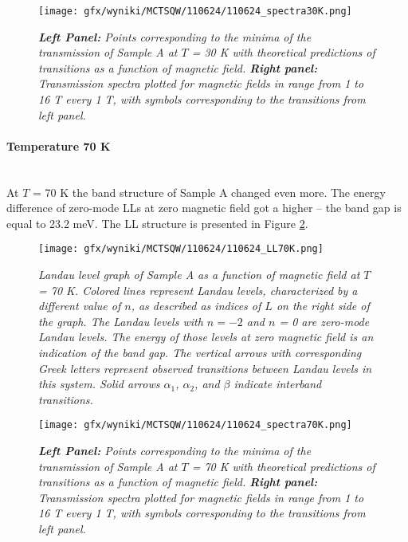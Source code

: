 \documentclass[titlepage,a4paper]{book}
\newcommand{\wciecie}{\quad\phantom{v}}
\newcommand{\myparagraph}[1]{\paragraph{#1}\mbox{}\\}
\begin{document}
\begin{figure}[H]
	\centering
	\texttt{[image: gfx/wyniki/MCTSQW/110624/110624\_spectra30K.png]}
	\vspace{-10pt}
	\caption{\textit{\textbf{Left Panel:} Points corresponding to the minima of the transmission of Sample A at $T$ = 30 K with theoretical predictions of transitions as a function of magnetic field. \textbf{Right panel:} Transmission spectra plotted for magnetic fields in range from 1 to 16 T every 1 T, with symbols corresponding to the transitions from left panel.}}
	\label{fig:Spectra_110624_30K}
\end{figure}

\myparagraph{Temperature 70 K}
\wciecie
At $T$ = 70 K the band structure of Sample A changed even more. The energy difference of zero-mode LLs at zero magnetic field got a higher -- the band gap is equal to 23.2 meV. The LL structure is presented in Figure \ref{fig:LL_110624_70K}.

\begin{figure}[H]
	\centering
	\texttt{[image: gfx/wyniki/MCTSQW/110624/110624\_LL70K.png]}
	\vspace{-10pt}
	\caption{\textit{Landau level graph of Sample A as a function of magnetic field at $T$ = 70 K. Colored lines represent Landau levels, characterized by a different value of $n$, as described as indices of $L$ on the right side of the graph. The Landau levels with $n = -2$ and $n$ = 0 are zero-mode Landau levels. The energy of those levels at zero magnetic field is an indication of the band gap. The vertical arrows with corresponding Greek letters represent observed transitions between Landau levels in this system. Solid arrows $\alpha_1$, $\alpha_2$, and $\beta$ indicate interband transitions.}}
	\label{fig:LL_110624_70K}
\end{figure}

\begin{figure}[ht]
	\centering
	\texttt{[image: gfx/wyniki/MCTSQW/110624/110624\_spectra70K.png]}
	\vspace{-10pt}
	\caption{\textit{\textbf{Left Panel:} Points corresponding to the minima of the transmission of Sample A at $T$ = 70 K with theoretical predictions of transitions as a function of magnetic field. \textbf{Right panel:} Transmission spectra plotted for magnetic fields in range from 1 to 16 T every 1 T, with symbols corresponding to the transitions from left panel.}}
	\label{fig:Spectra_110624_70K}
\end{figure}
\end{document}

